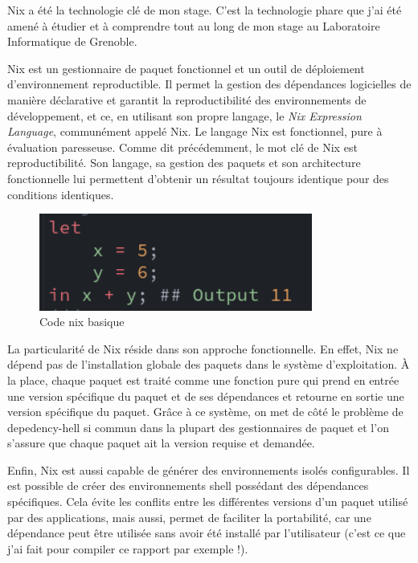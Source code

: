 \documentclass[a4paper,french,12pt, titlepage]{article}
\begin{document}
Nix a été la technologie clé de mon stage. C'est la technologie phare
que j'ai été amené à étudier et à comprendre tout au long de mon stage
au Laboratoire Informatique de Grenoble.\newline

Nix est un gestionnaire de paquet fonctionnel et un outil de déploiement
d'environnement reproductible. Il permet la gestion des dépendances
logicielles de manière déclarative et garantit la reproductibilité des
environnements de développement, et ce, en utilisant son propre langage,
le \emph{Nix Expression Language}, communément appelé Nix. Le langage
Nix est fonctionnel, pure à évaluation paresseuse. Comme dit
précédemment, le mot clé de Nix est reproductibilité. Son langage, sa
gestion des paquets et son architecture fonctionnelle lui permettent
d'obtenir un résultat toujours identique pour des conditions
identiques.\newline

\begin{figure}[h]
\centering
\includegraphics[width=0.8\textwidth,height=0.8\textheight,keepaspectratio]{images/codebasenixdark.png}
\caption{Code nix basique}
\end{figure}

La particularité de Nix réside dans son approche fonctionnelle. En
effet, Nix ne dépend pas de l'installation globale des paquets dans le
système d'exploitation. À la place, chaque paquet est traité comme une
fonction pure qui prend en entrée une version spécifique du paquet et de
ses dépendances et retourne en sortie une version spécifique du paquet.
Grâce à ce système, on met de côté le problème de \Gls{depedency-hell}
si commun dans la plupart des gestionnaires de paquet et l'on s'assure
que chaque paquet ait la version requise et demandée.\newline

Enfin, Nix est aussi capable de générer des environnements isolés
configurables. Il est possible de créer des environnements shell
possédant des dépendances spécifiques. Cela évite les conflits entre les
différentes versions d'un paquet utilisé par des applications, mais
aussi, permet de faciliter la portabilité, car une dépendance peut être
utilisée sans avoir été installé par l'utilisateur (c'est ce que j'ai
fait pour compiler ce rapport par exemple !).\newline
\end{document}
